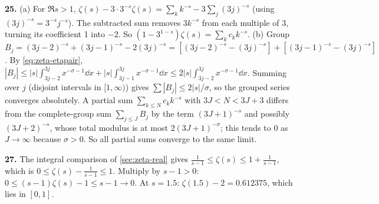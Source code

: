 \textbf{25.} (a) For $\Re s>1$, $\zeta(s)-3\cdot3^{-s}\zeta(s)=\sum_kk^{-s}-3\sum_j(3j)^{-s}$ (using $(3j)^{-s}=3^{-s}j^{-s}$). The subtracted sum removes $3k^{-s}$ from each multiple of 3, turning its coefficient 1 into $-2$. So $(1-3^{1-s})\zeta(s)=\sum_kc_kk^{-s}$. (b) Group $B_j=(3j-2)^{-s}+(3j-1)^{-s}-2(3j)^{-s}=[(3j-2)^{-s}-(3j)^{-s}]+[(3j-1)^{-s}-(3j)^{-s}]$. By \cref{eq:zeta-etapair}, $|B_j|\le|s|\int_{3j-2}^{3j}x^{-\sigma-1}\dd x+|s|\int_{3j-1}^{3j}x^{-\sigma-1}\dd x\le2|s|\int_{3j-2}^{3j}x^{-\sigma-1}\dd x$. Summing over $j$ (disjoint intervals in $[1,\infty)$) gives $\sum|B_j|\le2|s|/\sigma$, so the grouped series converges absolutely. A partial sum $\sum_{k\le N}c_kk^{-s}$ with $3J<N<3J+3$ differs from the complete-group sum $\sum_{j\le J}B_j$ by the term $(3J+1)^{-s}$ and possibly $(3J+2)^{-s}$, whose total modulus is at most $2(3J+1)^{-\sigma}$; this tends to 0 as $J\to\infty$ because $\sigma>0$. So all partial sums converge to the same limit.

\textbf{27.} The integral comparison of \cref{sec:zeta-real} gives $\frac1{s-1}\le\zeta(s)\le1+\frac1{s-1}$, which is $0\le\zeta(s)-\frac1{s-1}\le1$. Multiply by $s-1>0$: $0\le(s-1)\zeta(s)-1\le s-1\to0$. At $s=1.5$: $\zeta(1.5)-2=0.612375$, which lies in $[0,1]$.
